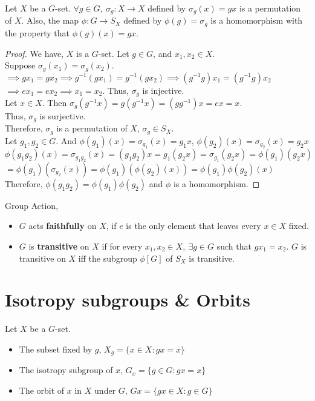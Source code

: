 \begin{theorem}
	Let $X$ be a $G$-set. $\forall g \in G,\ \sigma_g : X \to X$ defined by $\sigma_g(x) = gx$ is a permutation of $X$.
	Also, the map $\phi : G \to S_X$ defined by $\phi(g) = \sigma_g$ is a homomorphism with the property that $\phi(g)(x) = gx$.
\end{theorem}
\begin{proof}
	We have, $X$ is a $G$-set. Let $g \in G$, and $x_1,x_2 \in X$. \\
	Suppose $\sigma_g(x_1) = \sigma_g(x_2)$.\\
	$\implies gx_1 = gx_2 \implies g^{-1}(gx_1) = g^{-1}(gx_2) \implies (g^{-1}g)x_1 = (g^{-1}g)x_2$\\
	$\implies ex_1 = ex_2 \implies x_1 = x_2$. Thus, $\sigma_g$ is injective.\\
	Let $x \in X$. Then $\sigma_g(g^{-1}x) = g(g^{-1}x) = (gg^{-1})x = ex = x$.\\
	Thus, $\sigma_g$ is surjective.\\
	Therefore, $\sigma_g$ is a permutation of $X$, $\sigma_g \in S_X$.\\
	Let $g_1,g_2 \in G$. And $\phi(g_1)(x) = \sigma_{g_1}(x) = g_1x$, $\phi(g_2)(x) = \sigma_{g_2}(x) = g_2x$\\
	$\phi(g_1g_2)(x) = \sigma_{g_1g_2}(x) = (g_1g_2)x = g_1(g_2x) = \sigma_{g_1}(g_2x) = \phi(g_1)(g_2x)$\\
	\hphantom{$\phi(g_1g_2)(x)$} $= \phi(g_1)(\sigma_{g_2}(x)) = \phi(g_1)(\phi(g_2)(x)) = \phi(g_1)\phi(g_2)(x)$\\
	Therefore, $\phi(g_1g_2) = \phi(g_1)\phi(g_2)$ and $\phi$ is a homomorphism.
\end{proof}

\begin{definition}Group Action,
	\begin{itemize}
		\item $G$ acts \textbf{faithfully} on $X$, if $e$ is the only element that leaves every $x \in X$ fixed. 
		\item $G$ is \textbf{transitive} on $X$ if for every $x_1,x_2 \in X,\ \exists g \in G$ such that $gx_1 = x_2$. $G$ is transitive on $X$ iff the subgroup $\phi[G]$ of $S_X$ is transitive.
	\end{itemize}
\end{definition}
\pagebreak

\section{Isotropy subgroups \& Orbits}
\begin{definition}Let $X$ be a $G$-set.
	\begin{itemize}
		\item The subset fixed by $g$, $X_g = \{ x \in X : gx = x \}$
		\item The isotropy subgroup of $x$, $G_x = \{ g \in G : gx = x \}$
		\item The orbit of $x$ in $X$ under $G$, $Gx = \{ gx \in X : g \in G \}$
	\end{itemize}
\end{definition}

